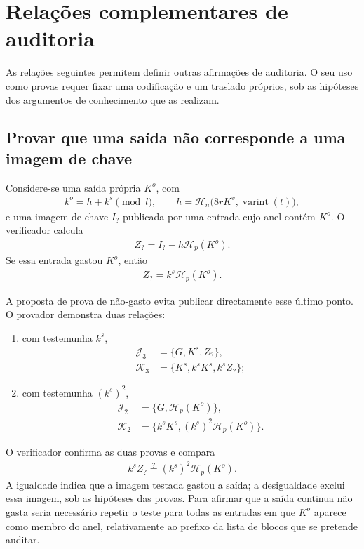 \section{Relações complementares de auditoria}

As relações seguintes permitem definir outras afirmações de auditoria. O seu
uso como provas requer fixar uma codificação e um traslado próprios, sob as
hipóteses dos argumentos de conhecimento que as realizam.

\subsection{Provar que uma saída não corresponde a uma imagem de chave}
\label{subsec:proofs-owned-output-spent-unspentproof}

Considere-se uma saída própria \(K^o\), com
\begin{align*}
 k^o=h+k^s\pmod l,
 \qquad h=\mathcal H_n\bigl(8rK^v,\operatorname{varint}(t)\bigr),
\end{align*}
e uma imagem de chave \(I_?\) publicada por uma entrada cujo anel contém
\(K^o\). O verificador calcula
\begin{align*}
 Z_?=I_?-h\mathcal H_p(K^o).
\end{align*}
Se essa entrada gastou \(K^o\), então
\begin{align*}
 Z_?=k^s\mathcal H_p(K^o).
\end{align*}

A proposta de prova de não-gasto \cite{unspent-proof-issue-68} evita publicar
directamente esse último ponto. O provador demonstra duas relações:
\begin{enumerate}
 \item com testemunha \(k^s\),
 \begin{align*}
  \mathcal J_3&=\{G,K^s,Z_?\},\\
  \mathcal K_3&=\{K^s,k^sK^s,k^sZ_?\};
 \end{align*}

 \item com testemunha \((k^s)^2\),
 \begin{align*}
  \mathcal J_2&=\{G,\mathcal H_p(K^o)\},\\
  \mathcal K_2&=\{k^sK^s,(k^s)^2\mathcal H_p(K^o)\}.
 \end{align*}
\end{enumerate}
O verificador confirma as duas provas e compara
\begin{align*}
 k^sZ_?\stackrel{?}{=}(k^s)^2\mathcal H_p(K^o).
\end{align*}
A igualdade indica que a imagem testada gastou a saída; a desigualdade exclui
essa imagem, sob as hipóteses das provas. Para afirmar que a saída continua
não gasta seria necessário repetir o teste para todas as entradas em que
\(K^o\) aparece como membro do anel, relativamente ao prefixo da lista de
blocos que se pretende auditar.

